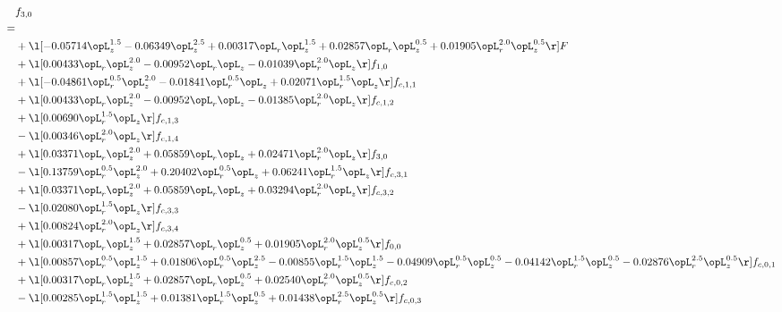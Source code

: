 \begin{alignat}{2} 
\label{eq:f_30_1} 
& f_{3,0} \nonumber \\ 
 = \\ 
& + \l[  -0.05714 \opL_z^{1.5}   -0.06349 \opL_z^{2.5} +  0.00317 \opL_r \opL_z^{1.5} +  0.02857 \opL_r \opL_z^{0.5} +  0.01905 \opL_r^{2.0} \opL_z^{0.5}  \r] F \nonumber \\ 
& + \l[  0.00433 \opL_r \opL_z^{2.0}   -0.00952 \opL_r \opL_z   -0.01039 \opL_r^{2.0} \opL_z  \r] f_{1,0} \nonumber \\ 
& + \l[  -0.04861 \opL_r^{0.5} \opL_z^{2.0}   -0.01841 \opL_r^{0.5} \opL_z +  0.02071 \opL_r^{1.5} \opL_z  \r] f_{c,1,1} \nonumber \\ 
& + \l[  0.00433 \opL_r \opL_z^{2.0}   -0.00952 \opL_r \opL_z   -0.01385 \opL_r^{2.0} \opL_z  \r] f_{c,1,2} \nonumber \\ 
& + \l[  0.00690 \opL_r^{1.5} \opL_z  \r] f_{c,1,3} \nonumber \\ 
& - \l[  0.00346 \opL_r^{2.0} \opL_z  \r] f_{c,1,4} \nonumber \\ 
& + \l[  0.03371 \opL_r \opL_z^{2.0} +  0.05859 \opL_r \opL_z +  0.02471 \opL_r^{2.0} \opL_z  \r] f_{3,0} \nonumber \\ 
& - \l[  0.13759 \opL_r^{0.5} \opL_z^{2.0} +  0.20402 \opL_r^{0.5} \opL_z +  0.06241 \opL_r^{1.5} \opL_z  \r] f_{c,3,1} \nonumber \\ 
& + \l[  0.03371 \opL_r \opL_z^{2.0} +  0.05859 \opL_r \opL_z +  0.03294 \opL_r^{2.0} \opL_z  \r] f_{c,3,2} \nonumber \\ 
& - \l[  0.02080 \opL_r^{1.5} \opL_z  \r] f_{c,3,3} \nonumber \\ 
& + \l[  0.00824 \opL_r^{2.0} \opL_z  \r] f_{c,3,4} \nonumber \\ 
& + \l[  0.00317 \opL_r \opL_z^{1.5} +  0.02857 \opL_r \opL_z^{0.5} +  0.01905 \opL_r^{2.0} \opL_z^{0.5}  \r] f_{0,0} \nonumber \\ 
& + \l[  0.00857 \opL_r^{0.5} \opL_z^{1.5} +  0.01806 \opL_r^{0.5} \opL_z^{2.5}   -0.00855 \opL_r^{1.5} \opL_z^{1.5}   -0.04909 \opL_r^{0.5} \opL_z^{0.5}   -0.04142 \opL_r^{1.5} \opL_z^{0.5}   -0.02876 \opL_r^{2.5} \opL_z^{0.5}  \r] f_{c,0,1} \nonumber \\ 
& + \l[  0.00317 \opL_r \opL_z^{1.5} +  0.02857 \opL_r \opL_z^{0.5} +  0.02540 \opL_r^{2.0} \opL_z^{0.5}  \r] f_{c,0,2} \nonumber \\ 
& - \l[  0.00285 \opL_r^{1.5} \opL_z^{1.5} +  0.01381 \opL_r^{1.5} \opL_z^{0.5} +  0.01438 \opL_r^{2.5} \opL_z^{0.5}  \r] f_{c,0,3} \nonumber \\ 

\end{alignat}
